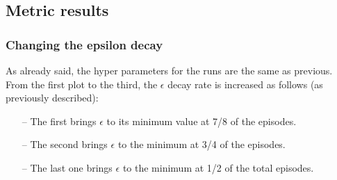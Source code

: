 \documentclass{article}
\begin{document}
\subsection{Metric results}

\subsubsection{Changing the epsilon decay}

As already said, the hyper parameters for the runs are the same as previous.
\\
From the first plot to the third, the $\epsilon$ decay rate is increased as follows (as previously described):
\begin{itemize}
\item[--] The first brings $\epsilon$ to its minimum value at 7/8 of the episodes.
\item[--] The second brings $\epsilon$ to the minimum at 3/4 of the episodes.
\item[--] The last one brings $\epsilon$ to the minimum at 1/2 of the total episodes.
\end{itemize}

\begin{center}
\centering
{}
\end{center}


\begin{center}
\centering
{}
\end{center}
\end{document}
